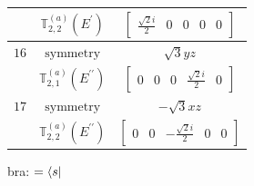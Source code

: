 \documentclass[fleqn,8pt,landscape]{jsarticle}
\begin{document}
\begin{longtable}{ccc}
$  $ & $ \mathbb{T}_{2,2}^{(a)}(E^{\prime}) $ & $ \begin{bmatrix} \frac{\sqrt{2} i}{2} & 0 & 0 & 0 & 0 \end{bmatrix} $ \\ \hline
$ 16 $ & $ \text{symmetry} $ & $ \sqrt{3} y z $ \\
$  $ & $ \mathbb{T}_{2,1}^{(a)}(E^{\prime\prime}) $ & $ \begin{bmatrix} 0 & 0 & 0 & \frac{\sqrt{2} i}{2} & 0 \end{bmatrix} $ \\ \hline
$ 17 $ & $ \text{symmetry} $ & $ - \sqrt{3} x z $ \\
$  $ & $ \mathbb{T}_{2,2}^{(a)}(E^{\prime\prime}) $ & $ \begin{bmatrix} 0 & 0 & - \frac{\sqrt{2} i}{2} & 0 & 0 \end{bmatrix} $ \\ \hline
\end{longtable}
bra: $=\bra{s}$
\end{document}
